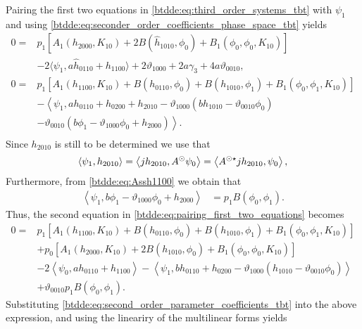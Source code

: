 Pairing the first two equations in \cref{btdde:eq:third_order_systems_tbt} with $\psi_1$ and using 
\cref{btdde:eq:seconder_order_coefficients_phase_space_tbt} yields
\begin{equation}
\label{btdde:eq:pairing_first_two_equations}
\begin{aligned}
0 ={}& p_1\left[A_1(h_{2000},K_{10})+ 2 B(\hat h_{1010},\phi_0) + B_1(\phi_0,\phi_0,K_{10})\right] \\
                         & -2\langle\psi_1,a \hat h_{0110} + h_{1100}\rangle + 2\vartheta_{1000}
                            + 2a\gamma_3 + 4a \vartheta_{0010}, \\
0 ={}& p_1 \left[A_1(h_{1100},K_{10}) + B(h_{0110},\phi_0) + B(h_{1010},\phi_1) + B_1(\phi_0,\phi_1,K_{10})\right] \\
                         & -\left<\psi_1,ah_{0110} + h_{0200} + h_{2010} - \vartheta_{1000} (b h_{1010} - \vartheta_{0010} \phi_0) \right. \\
                         & \left. - \vartheta_{0010} (b \phi_1 - \vartheta_{1000} \phi_0 + h_{2000})  \right>. \\
\end{aligned}
\end{equation}
Since $h_{2010}$ is still to be determined we use that
\[
    \left< \psi_1, h_{2010} \right> 
    = \left< j h_{2010}, A^\odot \psi_0 \right> 
    = \left< A^{\odot\star} j h_{2010}, \psi_0 \right>,
\]
Furthermore, from \cref{btdde:eq:Assh1100} we obtain that
\begin{align}
    \label{btdde:eq:psi1_Assh1000}
    \left<\psi_1, b \phi_1 - \vartheta_{1000} \phi_0 + h_{2000}  \right> &{}= p_1 B(\phi_0,\phi_1).
\end{align}
Thus, the second equation in \cref{btdde:eq:pairing_first_two_equations} becomes
\begin{align*}
0 ={}& p_1 \left[A_1(h_{1100},K_{10}) + B(h_{0110},\phi_0) + B(h_{1010},\phi_1) + B_1(\phi_0,\phi_1,K_{10})\right] \\
     & + p_0 \left[A_1(h_{2000},K_{10})+ 2 B(h_{1010},\phi_0) + B_1(\phi_0,\phi_0,K_{10})\right] \\
     & -2\left<\psi_0, a h_{0110} + h_{1100}\right> -\left<\psi_1,bh_{0110} + h_{0200} - \vartheta_{1000} (h_{1010} - \vartheta_{0010} \phi_0)\right> \\
     & + \vartheta_{0010} p_1 B(\phi_0,\phi_1).
\end{align*}
Substituting \cref{btdde:eq:second_order_parameter_coefficients_tbt} into the above expression, and using the lineariry of the multilinear forms yields
